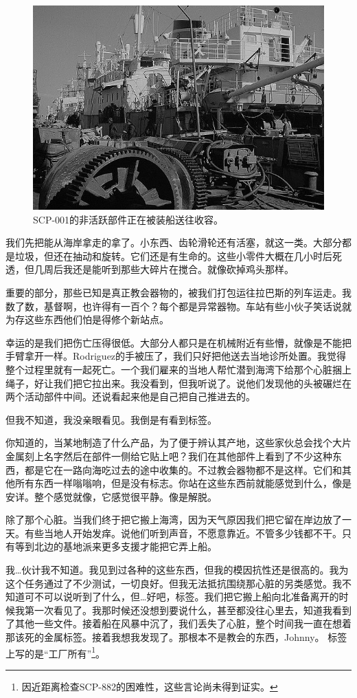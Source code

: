 
\begin{figure}[H]
	\centering
	\includegraphics[width=0.5\linewidth]{images/SCP-001-the-broken-god-9.jpg}
	\caption*{SCP-001的非活跃部件正在被装船送往收容。}
\end{figure}

\begin{scpbox}

我们先把能从海岸拿走的拿了。小东西、齿轮滑轮还有活塞，就这一类。大部分都是垃圾，但还在抽动和旋转。它们还是有生命的。这些小零件大概在几小时后死透，但几周后我还是能听到那些大碎片在搅合。就像砍掉鸡头那样。

重要的部分，那些已知是真正教会器物的，被我们打包运往拉巴斯的列车运走。我数了数，基督啊，也许得有一百个？每个都是异常器物。车站有些小伙子笑话说就为存这些东西他们怕是得修个新站点。

幸运的是我们把伤亡压得很低。大部分人都只是在机械附近有些懵，就像是不能把手臂拿开一样。Rodriguez的手被压了，我们只好把他送去当地诊所处置。我觉得整个过程里就有一起死亡。一个我们雇来的当地人帮忙潜到海湾下给那个心脏捆上绳子，好让我们把它拉出来。我没看到，但我听说了。说他们发现他的头被碾烂在两个活动部件中间。还说看起来他是自己把自己推进去的。

但我不知道，我没亲眼看见。我倒是有看到标签。

你知道的，当某地制造了什么产品，为了便于辨认其产地，这些家伙总会找个大片金属刻上名字然后在部件一侧给它贴上吧？我们在其他部件上看到了不少这种东西，都是它在一路向海吃过去的途中收集的。不过教会器物都不是这样。它们和其他所有东西一样嗡嗡响，但是没有标志。你站在这些东西前就能感觉到什么，像是安详。整个感觉就像，它感觉很平静。像是解脱。

除了那个心脏。当我们终于把它搬上海湾，因为天气原因我们把它留在岸边放了一天。有些当地人开始发痒。说他们听到声音，不愿意靠近。不管多少钱都不干。只有等到北边的基地派来更多支援才能把它弄上船。

我…伙计我不知道。我见到过各种的这些东西，但我的模因抗性还是很高的。我为这个任务通过了不少测试，一切良好。但我无法抵抗围绕那心脏的另类感觉。我不知道可不可以说听到了什么，但…好吧，标签。我们把它搬上船向北准备离开的时候我第一次看见了。我那时候还没想到要说什么，甚至都没往心里去，知道我看到了其他一些文件。接着船在风暴中沉了，我们丢失了心脏，整个时间我一直在想着那该死的金属标签。接着我想我发现了。那根本不是教会的东西，Johnny。
标签上写的是“工厂所有”\footnote{因近距离检查SCP-882的困难性，这些言论尚未得到证实。}。

\end{scpbox}

